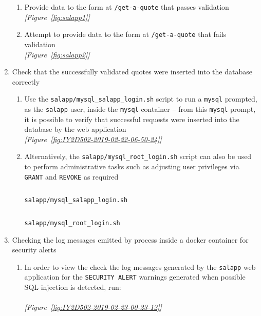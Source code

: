 \begin{enumerate}[leftmargin=0em,label=\protect\listlabelcircle{\arabic*}]
    \begin{enumerate}[label=\Roman*~\textcolor{light-gray}{|}]
      \item Provide data to the form at \texttt{/get-a-quote} that passes validation\\
        \textcolor{deep-gray}{\textit{[Figure~\ref{fig:salapp1}]}}
      \item Attempt to provide data to the form at \texttt{/get-a-quote} that fails validation\\
        \textcolor{deep-gray}{\textit{[Figure~\ref{fig:salapp2}]}}
    \end{enumerate}
  \item Check that the successfully validated quotes were inserted into the database correctly
    \begin{enumerate}[label=\Roman*~\textcolor{light-gray}{|}]
      \item Use the \texttt{salapp/mysql\_salapp\_login.sh} script to run a \texttt{mysql} prompted, as the \texttt{salapp} user, inside the \texttt{mysql} container -- from this \texttt{mysql} prompt, it is possible to verify that successful requests were inserted into the database by the web application\\
        \textcolor{deep-gray}{\textit{[Figure~\ref{fig:IY2D502-2019-02-22-06-50-24}]}}
      \item Alternatively, the \texttt{salapp/mysql\_root\_login.sh} script can also be used to perform administrative tasks such as adjusting user privileges via \texttt{GRANT} and \texttt{REVOKE} as required
      \begin{listing}[H]
        \captionsetup{skip=\skiplistingcaptionlen}
        \inputminted[breakanywhere]{bash}{../uswacs-2-iy2d502-salapp/mysql_salapp_login.sh}
        \caption{\texttt{salapp/mysql\_salapp\_login.sh}}
        \label{lst:meth:mysql_salapp_login_sh}
      \end{listing}
      \begin{listing}[H]
        \captionsetup{skip=\skiplistingcaptionlen}
        \inputminted[breakanywhere]{bash}{../uswacs-2-iy2d502-salapp/mysql_root_login.sh}
        \caption{\texttt{salapp/mysql\_root\_login.sh}}
        \label{lst:meth:mysql_root_login_sh}
      \end{listing}
    \end{enumerate}
  \item Checking the log messages emitted by process inside a docker container for security alerts
  \begin{enumerate}[label=\Roman*~\textcolor{light-gray}{|}]
    \item In order to view the check the log messages generated by the \texttt{salapp} web application for the \texttt{SECURITY ALERT} warnings generated when possible SQL injection is detected, run:\\
      \\
      \textcolor{deep-gray}{\textit{[Figure~\ref{fig:IY2D502-2019-02-23-00-23-12}]}}
  \end{enumerate}
\end{enumerate}
